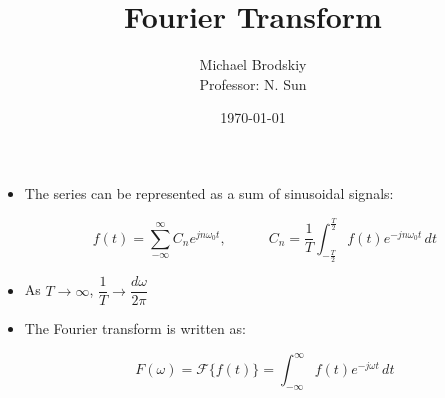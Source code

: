 


\title{Fourier Transform}
\date{\today}
\author{Michael Brodskiy\\ \small Professor: N. Sun}



\maketitle

\begin{itemize}

  \item The series can be represented as a sum of sinusoidal signals:

    $$f(t)=\sum_{-\infty}^{\infty} C_ne^{jn\omega_0t},\quad\quad\quad C_n=\frac{1}{T}\int_{-\frac{T}{2}}^{\frac{T}{2}} f(t)e^{-jn\omega_0 t}\,dt$$

  \item As $T\to\infty$, $\dfrac{1}{T}\to\dfrac{d\omega}{2\pi}$

  \item The Fourier transform is written as:

    $$F(\omega)=\mathcal{F}\{f(t)\}=\int_{-\infty}^{\infty}f(t)e^{-j\omega t}\,dt$$


\end{itemize}



